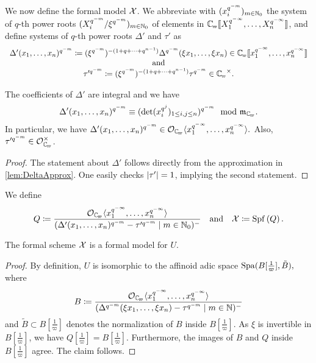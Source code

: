 \documentclass[../main.tex]{subfiles}
\begin{document}
We now define the formal model $\mathcal{X}$. We abbreviate with $(x_i^{q^{-m}})_{m \in
\mathbb{N}_0}$ the system of 
$q$-th power roots $(X_i^{q^{-m}}/\xi^{q^{-m}})_{m \in \mathbb{N}_0}$ of elements in
$\Cp \llbr X_1^{q^{-\infty}}, \dots, X_n^{q^{-\infty}}\rrbr$, and define
systems of $q$-th power roots $\Delta'$ and $\tau'$ as
\begin{equation*}
  \begin{array}c
  \Delta'(x_1, \dots, x_n)^{q^{-m}} \coloneq (\xi^{q^{-m}})^{-(1 + q + \dots +
  q^{n-1})} \Delta^{q^{-m}}(\xi x_1, \dots, \xi x_n) \in \Cp \llbr x_1^{q^{-\infty}}, \dots
  , x_n^{q^{-\infty}}\rrbr  \\
  \text{and} \\
  \tau'^{q^{-m}} \coloneq (\xi^{q^{-m}})^{-(1 + q + \dots + q^{n-1})} \tau^{q^{-m}} \in
  \Cp^\times.
  \end{array}
\end{equation*}

\begin{lem}\label{lem:PropsOfDeltaPrAndTauPr}
  The coefficients of $\Delta'$ are integral and we have
  \begin{equation*}
    \Delta'(x_1, \dots, x_n)^{q^{-m}} \equiv (\det(x_i^{q^j})_{1 \leq i,j \leq
    n})^{q^{-m}} \mod \fm_\Cp.
  \end{equation*}
  In particular, we have 
  $\Delta'(x_1, \dots, x_n)^{q^{-m}} \in \cO_\Cp \langle x_1^{q^{-\infty}}, \dots
  , x_n^{q^{-\infty}}\rangle.$
  Also, $\tau'^{q^{-m}} \in \cO_\Cp^\times$. 
\begin{proof}
  The statement about $\Delta'$ follows directly from the approximation in 
  \cref{lem:DeltaApprox}. One easily checks $\lvert \tau' \rvert = 1$, implying the second
  statement.
\end{proof}
\end{lem}

We define 
\begin{equation}\label{eq:defQ}
  Q \coloneq \frac
    {\cO_\Cp \langle x_1^{q^{-\infty}}, \dots , x_n^{q^{-\infty}}
      \rangle}
      {(\Delta'(x_1, \dots, x_n)^{q^{-m}} - \tau'^{q^{-m}} \mid m \in \N_0)^-}
      \quad \text{and} \quad
  \cX \coloneq \spf \left( Q \right).
\end{equation}

\begin{prop}\label{prop:AffinoidIsFormalModel}
  The formal scheme $\mathcal{X}$ is a formal model for $U$. 
\end{prop}
\begin{proof} 
  By definition, $U$ is isomorphic to the affinoid adic space $\operatorname{Spa}(B[\tfrac 1\varpi], \tilde B),$ where
  \begin{equation*}
    B \coloneqq \frac{\cO_\Cp \langle x_1^{q^{-\infty}}, \dots,
    x_n^{q^{-\infty}} \rangle}
    {(\Delta^{q^{-m}}(\xi x_1, \dots, \xi x_n) - \tau^{q^{-m}} \mid m \in \N)^-}
  \end{equation*}
  and $\tilde B \subset B[\tfrac 1\varpi]$ denotes the normalization of 
  $B$ inside $B[\tfrac 1 \varpi]$. 
  As $\xi$ is invertible in $B[\tfrac 1 \varpi]$, we have 
  $Q[\tfrac 1 \varpi] = B[\tfrac 1 \varpi]$. Furthermore, the images of 
  $B$ and $Q$ inside $B[\tfrac 1 \varpi]$ agree. The claim follows.
\end{proof}
\end{document}
